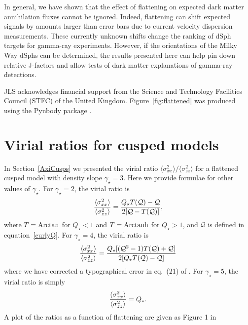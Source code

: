 \documentclass[prd,twocolumn,showpacs,preprintnumbers,superscriptaddress,nofootinbib,amsmath,amssymb,nobalancelastpage]{revtex4}
\def\arctanh{{\rm Arctanh}}
\def\arctan{{\rm Arctan}}
\begin{document}
In general, we have shown that the effect of flattening on expected dark matter annihilation fluxes cannot be ignored. Indeed, flattening can shift expected signals by amounts larger than error bars due to current velocity dispersion measurements. These currently unknown shifts change the ranking of dSph targets for gamma-ray experiments. However, if the orientations of the Milky Way dSphs can be determined, the results presented here can help pin down relative J-factors and allow tests of dark matter explanations of gamma-ray detections.

\begin{acknowledgments}
JLS acknowledges financial support from the Science and Technology Facilities Council (STFC) of the United Kingdom. Figure~\ref{fig:flattened} was produced using the Pynbody package \citep{Pynbody}.
\end{acknowledgments}



\appendix
\section{Virial ratios for cusped models}\label{CuspAppendix}
In Section~\ref{AxiCusps} we presented the virial ratio $\langle\sigma^2_{xx}\rangle/\langle\sigma^2_{zz}\rangle$ for a flattened cusped model with density slope $\gamma_\star=3$. Here we provide formulae for other values of $\gamma_\star$. For $\gamma_\star=2$, the virial ratio is
\begin{equation}
{\langle\sigma^2_{xx}\rangle \over \langle\sigma^2_{zz}\rangle}=\frac{Q_\star T(\mathcal{Q})-\mathcal{Q}}{2[\mathcal{Q}-T(\mathcal{Q})]},
\end{equation}
where $T=\arctan$ for $Q_\star<1$ and $T=\arctanh$ for $Q_\star>1$, and $\mathcal{Q}$ is defined in equation~\eqref{curlyQ}.
For $\gamma_\star=4$, the virial ratio is
%
\begin{equation}
{\langle\sigma^2_{xx}\rangle \over \langle\sigma^2_{zz}\rangle}=
\frac{Q_\star [ ( \mathcal{Q}^2-1)T(\mathcal{Q}) +
    \mathcal{Q}]}{2[Q_\star T(\mathcal{Q}) -\mathcal{Q}]}
\end{equation}
%
where we have corrected a typographical error in eq.~(21) of \citet{Ag12}. For $\gamma_\star=5$, the virial ratio is simply
\begin{equation}
{\langle\sigma^2_{xx}\rangle \over \langle\sigma^2_{zz}\rangle}=Q_\star.
\end{equation}
A plot of the ratios as a function of flattening are given as Figure 1
in \citep{Ag12}
\end{document}
